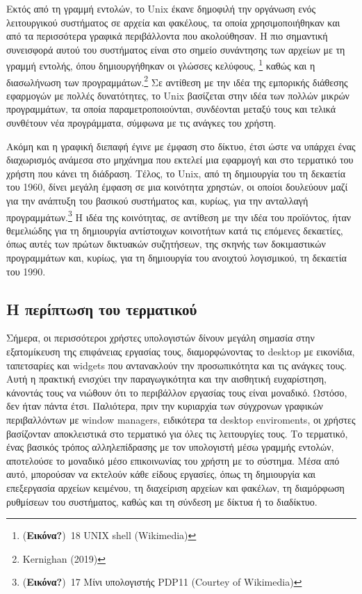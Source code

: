 \documentclass[
]{article}
\begin{document}
Εκτός από τη γραμμή εντολών, το Unix έκανε δημοφιλή την οργάνωση ενός
λειτουργικού συστήματος σε αρχεία και φακέλους, τα οποία
χρησιμοποιήθηκαν και από τα περισσότερα γραφικά περιβάλλοντα που
ακολούθησαν. Η πιο σημαντική συνεισφορά αυτού του συστήματος είναι στο
σημείο συνάντησης των αρχείων με τη γραμμή εντολής, όπου δημιουργήθηκαν
οι γλώσσες κελύφους, \footnote{(\textbf{Εικόνα?})~18 UNIX shell
  (Wikimedia)} καθώς και η διασωλήνωση των προγραμμάτων.\footnote{Kernighan
  (2019)} Σε αντίθεση με την ιδέα της εμπορικής διάθεσης εφαρμογών με
πολλές δυνατότητες, το Unix βασίζεται στην ιδέα των πολλών μικρών
προγραμμάτων, τα οποία παραμετροποιούνται, συνδέονται μεταξύ τους και
τελικά συνθέτουν νέα προγράμματα, σύμφωνα με τις ανάγκες του χρήστη.

Ακόμη και η γραφική διεπαφή έγινε με έμφαση στο δίκτυο, έτσι ώστε να
υπάρχει ένας διαχωρισμός ανάμεσα στο μηχάνημα που εκτελεί μια εφαρμογή
και στο τερματικό του χρήστη που κάνει τη διάδραση. Τέλος, το Unix, από
τη δημιουργία του τη δεκαετία του 1960, δίνει μεγάλη έμφαση σε μια
κοινότητα χρηστών, οι οποίοι δουλεύουν μαζί για την ανάπτυξη του βασικού
συστήματος και, κυρίως, για την ανταλλαγή προγραμμάτων.\footnote{(\textbf{Εικόνα?})~17
  Μίνι υπολογιστής PDP11 (Courtey of Wikimedia)} Η ιδέα της κοινότητας,
σε αντίθεση με την ιδέα του προϊόντος, ήταν θεμελιώδης για τη δημιουργία
αντίστοιχων κοινοτήτων κατά τις επόμενες δεκαετίες, όπως αυτές των
πρώτων δικτυακών συζητήσεων, της σκηνής των δοκιμαστικών προγραμμάτων
και, κυρίως, για τη δημιουργία του ανοιχτού λογισμικού, τη δεκαετία του
1990.

\hypertarget{ux3b7-ux3c0ux3b5ux3c1ux3afux3c0ux3c4ux3c9ux3c3ux3b7-ux3c4ux3bfux3c5-ux3c4ux3b5ux3c1ux3bcux3b1ux3c4ux3b9ux3baux3bfux3cd}{%
\subsection{Η περίπτωση του
τερματικού}\label{ux3b7-ux3c0ux3b5ux3c1ux3afux3c0ux3c4ux3c9ux3c3ux3b7-ux3c4ux3bfux3c5-ux3c4ux3b5ux3c1ux3bcux3b1ux3c4ux3b9ux3baux3bfux3cd}}

Σήμερα, οι περισσότεροι χρήστες υπολογιστών δίνουν μεγάλη σημασία στην
εξατομίκευση της επιφάνειας εργασίας τους, διαμορφώνοντας το desktop με
εικονίδια, ταπετσαρίες και widgets που αντανακλούν την προσωπικότητα και
τις ανάγκες τους. Αυτή η πρακτική ενισχύει την παραγωγικότητα και την
αισθητική ευχαρίστηση, κάνοντάς τους να νιώθουν ότι το περιβάλλον
εργασίας τους είναι μοναδικό. Ωστόσο, δεν ήταν πάντα έτσι. Παλιότερα,
πριν την κυριαρχία των σύγχρονων γραφικών περιβαλλόντων με window
managers, ειδικότερα τα desktop enviroments, οι χρήστες βασίζονταν
αποκλειστικά στο τερματικό για όλες τις λειτουργίες τους. Το τερματικό,
ένας βασικός τρόπος αλληλεπίδρασης με τον υπολογιστή μέσω γραμμής
εντολών, αποτελούσε το μοναδικό μέσο επικοινωνίας του χρήστη με το
σύστημα. Μέσα από αυτό, μπορούσαν να εκτελούν κάθε είδους εργασίες, όπως
τη δημιουργία και επεξεργασία αρχείων κειμένου, τη διαχείριση αρχείων
και φακέλων, τη διαμόρφωση ρυθμίσεων του συστήματος, καθώς και τη
σύνδεση με δίκτυα ή το διαδίκτυο.
\end{document}
